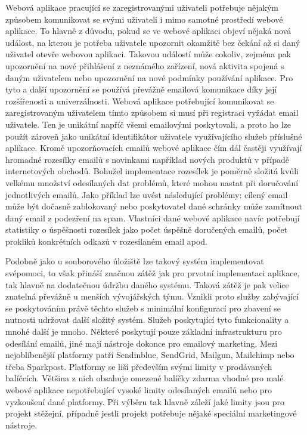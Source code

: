	Webová aplikace pracující se zaregistrovanými uživateli potřebuje nějakým způsobem komunikovat se svými uživateli i
	mimo samotné prostředí webové aplikace.
	To hlavně z důvodu, pokud se ve webové aplikaci objeví nějaká nová událost, na kterou je potřeba uživatele upozornit
	okamžitě bez čekání až si daný uživatel otevře webovou aplikaci.
	Takovou událostí může cokoliv, zejména pak upozornění na nové přihlášení z neznámého zařízení, nová aktivita spojená
	s daným uživatelem nebo upozornění na nové podmínky používání aplikace.
	Pro tyto a další upozornění se používá převážně emailová komunikace díky její rozšířenosti a univerzálnosti.
	Webová aplikace potřebující komunikovat se zaregistrovaným uživatelem tímto způsobem si musí při registraci
	vyžádat email uživatele.
	Ten je unikátní napříč všemi emailovými poskytovali, a proto ho lze použít zároveň jako unikátní identifikátor
	uživatele využívajícího služeb příslušné aplikace.
	Kromě upozorňovacích emailů webové aplikace čím dál častěji využívají hromadné rozesílky emailů s novinkami
	například nových produktů v případě internetových obchodů.
	Bohužel implementace rozesílek je poměrně složitá kvůli velkému množství odesílaných dat problémů, které mohou nastat
	při doručování jednotlivých emailů.
	Jako příklad lze uvést následující problémy: cílený email může být dočasně zablokovaný nebo
	poskytovatel dané schránky může zamítnout daný email z podezření na spam.
	Vlastníci dané webové aplikace navíc potřebují statistiky o úspěšnosti rozesílek jako počet úspěšně doručených emailů,
	počet prokliků konkrétních odkazů v rozesílaném email apod.

	Podobně jako u souborového úložiště lze takový systém implementovat svépomoci, to však přináší značnou zátěž jak pro
	prvotní implementaci aplikace, tak hlavně na dodatečnou údržbu daného systému.
	Taková zátěž je pak velice znatelná převážně u menších vývojářských týmu.
	Vznikli proto služby zabývající se poskytováním právě těchto služeb s minimální konfigurací pro zbavení se nutnosti
	udržovat další složitý systém.
	Služeb poskytující tyto funkcionality a mnohé další je mnoho.
	Některé poskytují pouze základní infrastrukturu pro odesílání emailů, jiné mají nástroje dokonce pro emailový
	marketing.
	Mezi nejoblíbenější platformy patří Sendinblue, SendGrid, Mailgun, Mailchimp nebo třeba Sparkpost.
	Platformy se liší především svými limity v prodávaných balíčcích.
	Většina z nich obsahuje omezené balíčky zdarma vhodné pro malé webové aplikace nepotřebující vysoké limity odesílaných
	emailů nebo pro vyzkoušení dané platformy.
	Při výběru tak hlavně záleží jaké limity jsou pro projekt stěžejní, případně jestli projekt potřebuje nějaké speciální
	marketingové nástroje.

